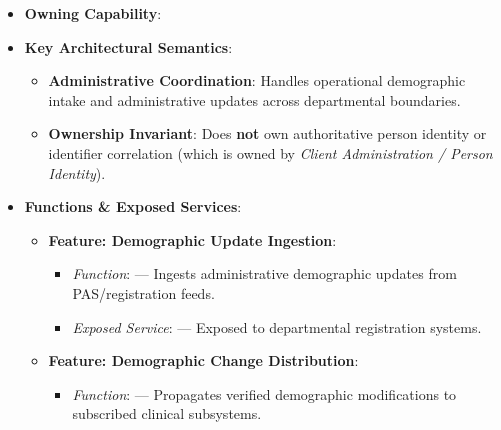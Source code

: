 \begin{itemize}

\item
\textbf{Owning Capability}: \texttt{}



\item
\textbf{Key Architectural Semantics}:


\begin{itemize}

\item
\textbf{Administrative Coordination}: Handles operational demographic intake and administrative updates across departmental boundaries.



\item
\textbf{Ownership Invariant}: Does \textbf{not} own authoritative person identity or identifier correlation (which is owned by \emph{Client Administration /\allowbreak{} Person Identity}).



\end{itemize}


\item
\textbf{Functions \& Exposed Services}:


\begin{itemize}

\item
\textbf{Feature: Demographic Update Ingestion}:


\begin{itemize}

\item
\emph{Function}: \texttt{} — Ingests administrative demographic updates from PAS/\allowbreak{}registration feeds.



\item
\emph{Exposed Service}: \texttt{} — Exposed to departmental registration systems.



\end{itemize}


\item
\textbf{Feature: Demographic Change Distribution}:


\begin{itemize}

\item
\emph{Function}: \texttt{} — Propagates verified demographic modifications to subscribed clinical subsystems.




\end{itemize}
\end{itemize}
\end{itemize}

